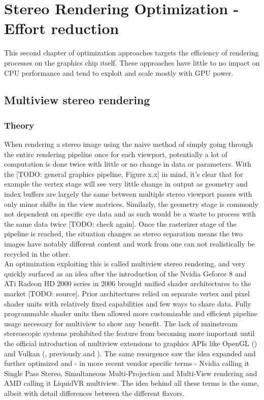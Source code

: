 
\chapter{Stereo Rendering Optimization - Effort reduction}
This second chapter of optimization approaches targets the efficiency of rendering processes on the graphics chip itself. These approaches have little to no impact on CPU performance and tend to exploit and scale mostly with GPU power. 

\section{Multiview stereo rendering}
\subsection{Theory}
When rendering a stereo image using the naive method of simply going through the entire rendering pipeline once for each viewport, potentially a lot of computation is done twice with little or no change in data or parameters. 
With the [TODO: general graphics pipeline, Figure x.x] in mind, it's clear that for example the vertex stage will see very little change in output as geometry and index buffers are largely the same between multiple stereo viewport passes with only minor shifts in the view matrices. Similarly, the geometry stage is commonly not dependent on specific eye data and as such would be a waste to process with the same data twice [TODO: check again]. Once the rasterizer stage of the pipeline is reached, the situation changes as stereo separation means the two images have notably different content and work from one can not realistically be recycled in the other. \\

An optimization exploiting this is called multiview stereo rendering, and very quickly surfaced as an idea after the introduction of the Nvidia Geforce 8 and ATi Radeon HD 2000 series in 2006 brought unified shader architectures to the market [TODO: source]. Prior architectures relied on separate vertex and pixel shader units with relatively fixed capabilities and few ways to share data. Fully programmable shader units then allowed more customizable and efficient pipeline usage necessary for multiview to show any benefit. 
The lack of mainstream stereoscopic systems prohibited the feature from becoming more important until the official introduction of multiview extensions to graphics APIs like OpenGL () and Vulkan (, previously  and ). 
The same resurgence saw the idea expanded and further optimized and - in more recent vendor specific terms - Nvidia calling it Single Pass Stereo, Simultaneous Multi-Projection and Multi-View rendering and AMD calling it LiquidVR multiview. The idea behind all these terms is the same, albeit with detail differences between the different flavors. \\

